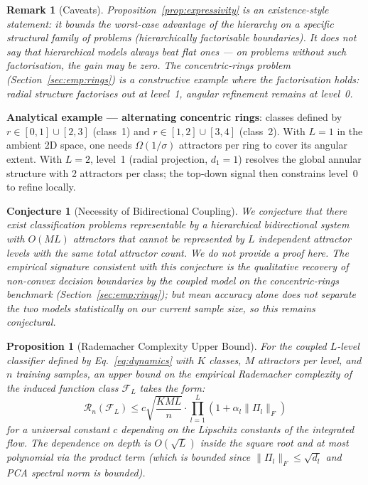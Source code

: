 \documentclass[11pt,a4paper]{article}
\newtheorem{proposition}[theorem]{Proposition}
\newtheorem{remark}[theorem]{Remark}
\newtheorem{conjecture}[theorem]{Conjecture}
\begin{document}
\begin{remark}[Caveats]
Proposition~\ref{prop:expressivity} is an \emph{existence}-style statement: it bounds
the worst-case advantage of the hierarchy on a specific structural family of problems
(hierarchically factorisable boundaries). It does not say that hierarchical models always
beat flat ones --- on problems without such factorisation, the gain may be zero. The
concentric-rings problem (Section~\ref{sec:emp:rings}) is a constructive example where the
factorisation holds: radial structure factorises out at level~1, angular refinement
remains at level~0.
\end{remark}

\textbf{Analytical example --- alternating concentric rings}: classes defined by
$r \in [0,1] \cup [2,3]$ (class~1) and $r \in [1,2] \cup [3,4]$ (class~2). With $L=1$
in the ambient 2D space, one needs $\Omega(1/\sigma)$ attractors per ring to cover its
angular extent. With $L=2$, level~1 (radial projection, $d_1=1$) resolves the global
annular structure with 2 attractors per class; the top-down signal then constrains
level~0 to refine locally.

\begin{conjecture}[Necessity of Bidirectional Coupling]
\label{prop:bidi_necessary}
We conjecture that there exist classification problems representable by a hierarchical
bidirectional system with $O(ML)$ attractors that cannot be represented by $L$ independent
attractor levels with the same total attractor count. We do not provide a proof here. The
empirical signature consistent with this conjecture is the qualitative recovery of
non-convex decision boundaries by the coupled model on the concentric-rings benchmark
(Section~\ref{sec:emp:rings}); but mean accuracy alone does not separate the two models
statistically on our current sample size, so this remains conjectural.
\end{conjecture}

\begin{proposition}[Rademacher Complexity Upper Bound]
\label{prop:rademacher}
For the coupled $L$-level classifier defined by Eq.~\ref{eq:dynamics} with $K$ classes,
$M$ attractors per level, and $n$ training samples, an upper bound on the empirical
Rademacher complexity of the induced function class $\mathcal{F}_L$ takes the form:
\begin{equation}
  \mathcal{R}_n(\mathcal{F}_L) \le c \sqrt{\frac{KML}{n}}
    \cdot \prod_{l=1}^{L}(1 + \alpha_l\|\Pi_l\|_F)
\end{equation}
for a universal constant $c$ depending on the Lipschitz constants of the integrated flow.
The dependence on depth is $O(\sqrt{L})$ inside the square root and at most polynomial via
the product term (which is bounded since $\|\Pi_l\|_F \le \sqrt{d_l}$ and PCA spectral
norm is bounded).
\end{proposition}
\end{document}
